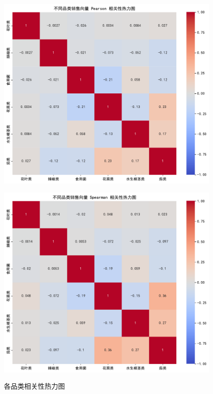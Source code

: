 \documentclass{cumcmthesis} %
\begin{document}
\begin{figure}[H]
    \centering
    \begin{minipage}[c]{0.45\textwidth}
        \centering
        \includegraphics[width=\textwidth]{fig/category_pearson_correlation_heatmap.pdf}
        \label{fig:sample-figure-a}
    \end{minipage}
    \begin{minipage}[c]{0.45\textwidth}
        \centering
        \includegraphics[width=\textwidth]{fig/category_spearman_correlation_heatmap.pdf}
        \label{fig:sample-figure-b}
    \end{minipage}
    \caption{各品类相关性热力图}
    \label{fig:sample-figure}
\end{figure}
\end{document}
